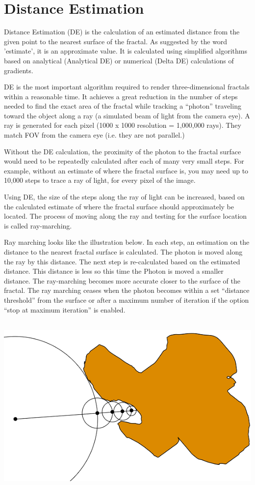 \section{Distance Estimation}\label{distance-estimation}

Distance Estimation (DE) is the calculation of an estimated distance
from the given point to the nearest surface of the fractal. As suggested
by the word 'estimate', it is an approximate value. It is calculated
using simplified algorithms based on analytical (Analytical DE) or
numerical (Delta DE) calculations of gradients.

DE is the most important algorithm required to render three-dimensional
fractals within a reasonable time. It achieves a great reduction in the
number of steps needed to find the exact area of the fractal while
tracking a ``photon'' traveling toward the object along a ray (a
simulated beam of light from the camera eye). A ray is generated for
each pixel (1000 x 1000 resolution = 1,000,000 rays). They match FOV
from the camera eye (i.e. they are not parallel.)

Without the DE calculation, the proximity of the photon to the fractal
surface would need to be repeatedly calculated after each of many very
small steps. For example, without an estimate of where the fractal
surface is, you may need up to 10,000 steps to trace a ray of light, for
every pixel of the image.

Using DE, the size of the steps along the ray of light can be increased,
based on the calculated estimate of where the fractal surface should
approximately be located. The process of moving along the ray and
testing for the surface location is called ray-marching.

Ray marching looks like the illustration below. In each step, an
estimation on the distance to the nearest fractal surface is calculated.
The photon is moved along the ray by this distance. The next step is
re-calculated based on the estimated distance. This distance is less so
this time the Photon is moved a smaller distance. The ray-marching
becomes more accurate closer to the surface of the fractal. The ray
marching ceases when the photon becomes within a set ``distance
threshold'' from the surface or after a maximum number of iteration if
the option ``stop at maximum iteration'' is enabled.

\includegraphics[width=5.87222in,height=3.56944in]{img/manual/media/image4.png}

